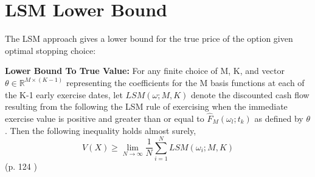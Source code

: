 \section{LSM Lower Bound}\label{LSMLowerBound}
The LSM approach gives a lower bound for the true price of the option given optimal stopping choice:
\theoremstyle{proposition}
\begin{proposition}{}\label{Lower-Bound-LSM}
\textbf{Lower Bound To True Value:} For any finite choice of M, K, and vector $\theta\in \mathbb{R}^{M \times (K-1)}$ representing the coefficients for the M basis functions at each of the K-1 early exercise dates, let $LSM(\omega;M,K)$ denote the discounted cash flow resulting from the following the LSM rule of exercising when the immediate exercise value is positive and greater than or equal to $\hat{F}_{M}(\omega_{l};t_{k})$ as defined by $\theta$. Then the following inequality holds almost surely,
$$V(X)\geq \lim_{N\to \infty} \dfrac{1}{N}\sum_{i=1}^{N} LSM(\omega_i;M,K)$$
\null \hfill (p. 124 \parencite{LSM})
\end{proposition}